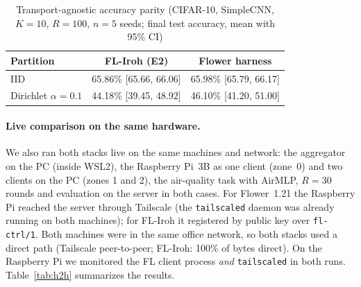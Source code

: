 \documentclass[a4paper,fleqn]{cas-dc}
\begin{document}
\begin{table}[t]
\centering
\caption{Transport-agnostic accuracy parity (CIFAR-10, SimpleCNN, $K{=}10$, $R{=}100$, $n{=}5$ seeds; final test accuracy, mean with 95\% CI)}
\label{tab:e7acc}
\scriptsize
\renewcommand{\arraystretch}{1.25}
\setlength{\tabcolsep}{3.5pt}
\begin{tabular}{l c c}
\toprule
\textbf{Partition} & \textbf{FL-Iroh (E2)} & \textbf{Flower harness} \\
\midrule
IID                      & 65.86\% [65.66, 66.06] & 65.98\% [65.79, 66.17] \\
Dirichlet $\alpha{=}0.1$ & 44.18\% [39.45, 48.92] & 46.10\% [41.20, 51.00] \\
\bottomrule
\end{tabular}
\end{table}

\paragraph{Live comparison on the same hardware.} We also ran both stacks live on the same machines and network: the aggregator on the PC (inside WSL2), the Raspberry Pi~3B as one client (zone~0) and two clients on the PC (zones 1 and 2), the air-quality task with AirMLP, $R{=}30$ rounds and evaluation on the server in both cases. For Flower~1.21 the Raspberry Pi reached the server through Tailscale (the \texttt{tailscaled} daemon was already running on both machines); for FL-Iroh it registered by public key over \texttt{fl-ctrl/1}. Both machines were in the same office network, so both stacks used a direct path (Tailscale peer-to-peer; FL-Iroh: 100\% of bytes direct). On the Raspberry Pi we monitored the FL client process \emph{and} \texttt{tailscaled} in both runs. Table~\ref{tab:h2h} summarizes the results.
\end{document}
